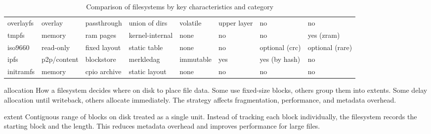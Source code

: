 \documentclass[openany, 12pt]{book}
\begin{document}
\begin{table}[h]
{\begin{tabular}{llllllll}
			overlayfs    & overlay     & passthrough  & union of dirs   & volatile       & upper layer  & no             & no              \\
			tmpfs        & memory      & ram pages    & kernel-internal & none           & no           & no             & yes (zram)      \\
			iso9660      & read-only   & fixed layout & static table    & none           & no           & optional (crc) & optional (rare) \\
			ipfs         & p2p/content & blockstore   & merkledag       & immutable      & yes          & yes (by hash)  & no              \\
			initramfs    & memory      & cpio archive & static layout   & none           & no           & no             & no              \\
			\bottomrule
		\end{tabular}
	}
	\caption{Comparison of filesystems by key characteristics and category}
\end{table}

\begin{definition}{allocation}{}
	How a filesystem decides where on disk to place file data. Some use
	fixed-size blocks, others group them into extents. Some delay allocation
	until writeback, others allocate immediately. The strategy affects
	fragmentation, performance, and metadata overhead.
\end{definition}

\begin{definition}{extent}{}
	Contiguous range of blocks on disk treated as a single unit. Instead of
	tracking each block individually, the filesystem records the starting block
	and the length. This reduces metadata overhead and improves performance for
	large files.
\end{definition}
\end{document}
